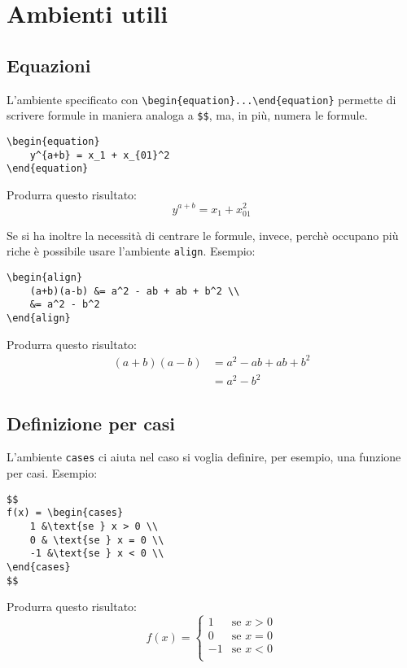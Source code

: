 \section{Ambienti utili}

\subsection{Equazioni}
L'ambiente specificato con \verb!\begin{equation}...\end{equation}! permette di scrivere formule in maniera analoga a \verb!$$!, ma, in più, numera le formule.
\begin{lstlisting}
\begin{equation}
    y^{a+b} = x_1 + x_{01}^2
\end{equation}
\end{lstlisting}
Produrra questo risultato:\\
\begin{equation}
    y^{a+b} = x_1 + x_{01}^2
\end{equation}
\par
Se si ha inoltre la necessità di centrare le formule, invece, perchè occupano più riche è possibile usare l'ambiente \verb!align!. Esempio:
\begin{lstlisting}
\begin{align}
    (a+b)(a-b) &= a^2 - ab + ab + b^2 \\
    &= a^2 - b^2
\end{align}
\end{lstlisting}
Produrra questo risultato:\\
\begin{align}
    (a+b)(a-b) &= a^2 - ab + ab + b^2 \\
    &= a^2 - b^2
\end{align}

\subsection{Definizione per casi}
L'ambiente \verb!cases! ci aiuta nel caso si voglia definire, per esempio, una funzione per casi. Esempio:
\begin{lstlisting}
$$
f(x) = \begin{cases}
    1 &\text{se } x > 0 \\
    0 & \text{se } x = 0 \\
    -1 &\text{se } x < 0 \\
\end{cases}
$$
\end{lstlisting}
Produrra questo risultato:\\
$$
f(x) = \begin{cases}
    1 &\text{se } x > 0 \\
    0 & \text{se } x = 0 \\
    -1 &\text{se } x < 0 \\
\end{cases}
$$